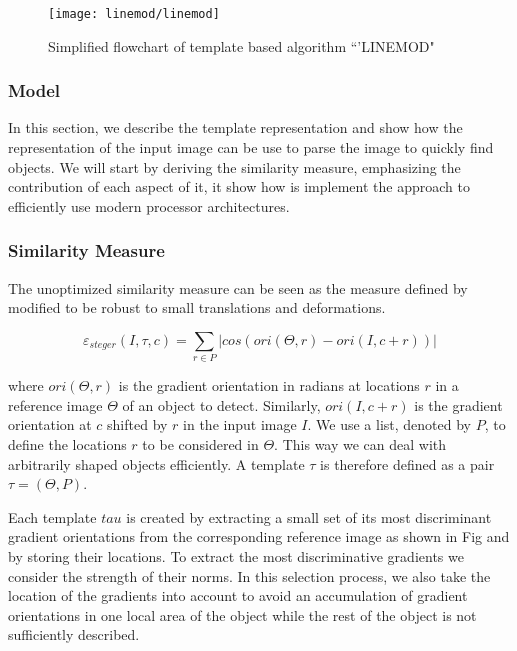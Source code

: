 \begin{figure}[ht]
\centering
\texttt{[image: linemod/linemod]}
\caption{Simplified flowchart of template based algorithm ``'LINEMOD" \citet{Hinterstoisser2011}}
\label{fig:clutter}
\end{figure}

\subsubsection{Model}
In this section, we describe the template representation and show how the representation 
of the input image can be use to parse the image to quickly find objects.
We will start by deriving the similarity measure, emphasizing the contribution of each 
aspect of it,  it show how is implement the approach to
efficiently use modern processor architectures.

\subsubsection{Similarity Measure}
The unoptimized similarity measure can be seen as the measure defined by \citet{Steger2002} 
modified to be robust to small translations and deformations. 

\begin{equation}
\label{eq:similarity}
\varepsilon_{steger}(I, \tau, c) = \sum_{r \in P}\left| cos(ori(\Theta,r) - ori(I,c+r))\right|
\end{equation}

where $ori(\Theta,r)$ is the gradient orientation in radians at locations $r$ in a 
reference image $\Theta$ of an object to detect. Similarly, $ori(I,c+r)$ is the 
gradient orientation at $c$ shifted by $r$ in the input image $I$. We use a list,
denoted by $P$, to define the locations $r$ to be considered in $\Theta$. This way we
can deal with arbitrarily shaped objects efficiently. A template $\tau$ is therefore
defined as a pair $\tau=(\Theta,P)$.

Each template $tau$ is created by extracting a small set of its most discriminant
gradient orientations from the corresponding reference image as shown in Fig
and by storing their locations. To extract the most discriminative gradients we consider
the strength of their norms. In this selection process, we also take the location
of the gradients into account to avoid an accumulation of gradient orientations in
one local area of the object while the rest of the object is not sufficiently described.

